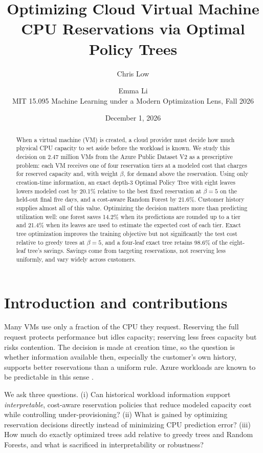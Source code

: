 \documentclass[10pt]{article}
\title{\vspace{-1.5em}Optimizing Cloud Virtual Machine CPU Reservations via Optimal Policy Trees}
\author{Chris Low \and Emma Li\\[1pt] \small MIT 15.095 Machine Learning under a Modern Optimization Lens, Fall 2026}
\date{\small December 1, 2026}
\begin{document}
\maketitle
\vspace{-1.8em}

\begin{abstract}
\noindent When a virtual machine (VM) is created, a cloud provider must decide how much physical CPU capacity to set aside before the workload is known. We study this decision on 2.47 million VMs from the Azure Public Dataset V2 as a prescriptive problem: each VM receives one of four reservation tiers at a modeled cost that charges for reserved capacity and, with weight $\beta$, for demand above the reservation. Using only creation-time information, an exact depth-3 Optimal Policy Tree with eight leaves lowers modeled cost by 20.1\% relative to the best fixed reservation at $\beta=5$ on the held-out final five days, and a cost-aware Random Forest by 21.6\%. Customer history supplies almost all of this value. Optimizing the decision matters more than predicting utilization well: one forest saves 14.2\% when its predictions are rounded up to a tier and 21.4\% when its leaves are used to estimate the expected cost of each tier. Exact tree optimization improves the training objective but not significantly the test cost relative to greedy trees at $\beta=5$, and a four-leaf exact tree retains 98.6\% of the eight-leaf tree's savings. Savings come from targeting reservations, not reserving less uniformly, and vary widely across customers.
\end{abstract}

\section{Introduction and contributions}
\label{sec:intro}

Many VMs use only a fraction of the CPU they request. Reserving the full request protects performance but idles capacity; reserving less frees capacity but risks contention. The decision is made at creation time, so the question is whether information available then, especially the customer's own history, supports better reservations than a uniform rule. Azure workloads are known to be predictable in this sense \citep{cortez2017resource}.

We ask three questions. (i) Can historical workload information support \emph{interpretable}, cost-aware reservation policies that reduce modeled capacity cost while controlling under-provisioning? (ii) What is gained by optimizing reservation decisions directly instead of minimizing CPU prediction error? (iii) How much do exactly optimized trees add relative to greedy trees and Random Forests, and what is sacrificed in interpretability or robustness?
\end{document}

